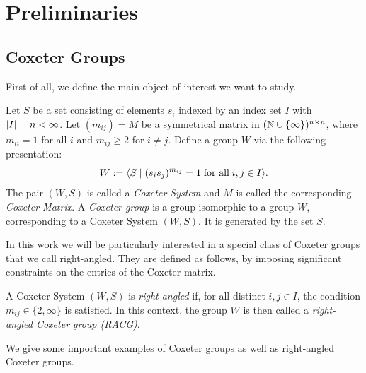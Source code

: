 \chapter{Preliminaries}\label{ch:preliminaries}

\section{Coxeter Groups}

First of all, we define the main object of interest we want to study.

\begin{definition}\label{def:CoxeterGroup}
    Let \(S\) be a set consisting of elements \(s_i\) indexed by an index set \(I\) with \(\left\vert I\right\vert = n < \infty\).
    Let  \((m_{ij}) = M\) be a symmetrical matrix in \((\mathbb{N}\cup\{\infty\})^{n\times n}\), where \(m_{ii}=1\) for all \(i\) and \(m_{ij}\geq 2\) for \(i\neq j\).
    Define a group \(W\) via the following presentation:
    \begin{equation*}
        W := \langle S\;\vert\;(s_is_j)^{m_{ij}}=1 \; \text{for all} \; i,j\in I\rangle.
    \end{equation*}
    The pair \((W, S)\) is called a \emph{Coxeter System} and \(M\) is called the corresponding \emph{Coxeter Matrix}.
    A \emph{Coxeter group} is a group isomorphic to a group \(W\), corresponding to a Coxeter System \((W,S)\).
    It is generated by the set \(S\).
\end{definition}

In this work we will be particularly interested in a special class of Coxeter groups that we call right-angled.
They are defined as follows, by imposing significant constraints on the entries of the Coxeter matrix.

\begin{definition}
    A Coxeter System \((W, S)\) is \emph{right-angled} if, for all distinct \(i,j\in I\), the condition \(m_{ij}\in\{2,\infty\}\) is satisfied.
    In this context, the group \(W\) is then called a \emph{right-angled Coxeter group (RACG)}.
\end{definition}

We give some important examples of Coxeter groups as well as right-angled Coxeter groups.


